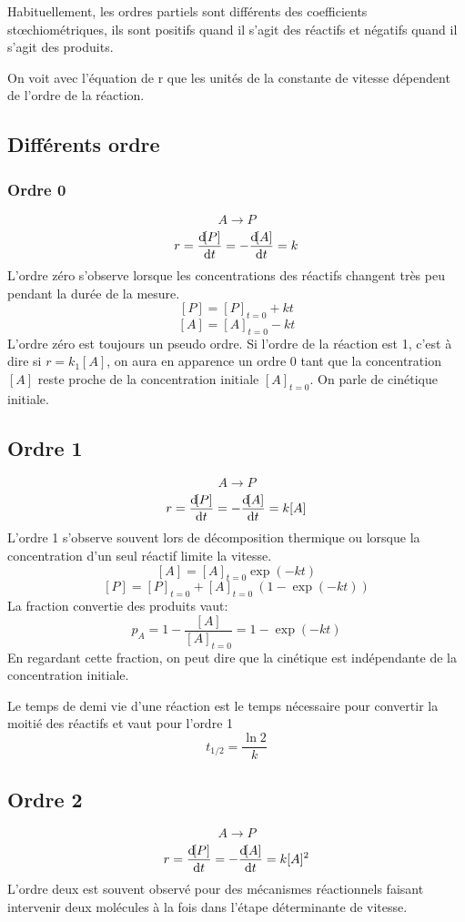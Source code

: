 Habituellement, les ordres partiels sont différents
des coefficients stœchiométriques,
ils sont positifs quand il s'agit des réactifs et
négatifs quand il s'agit des produits.

On voit avec l'équation de r que les unités de
la constante de vitesse dépendent de l'ordre de la réaction.

\subsection{Différents ordre}
\subsubsection{Ordre 0}
\[ A\longrightarrow P \]
\[ r = \frac{\operatorname{d}\! [P]}{\operatorname{d}\! t} = -\frac{\operatorname{d}\! [A]}{\operatorname{d}\! t} = k \]
L'ordre zéro s'observe lorsque les concentrations des réactifs
changent très peu pendant la durée de la mesure.
\[ [P] = [P]_{t = 0}+kt \]
\[ [A] = [A]_{t = 0}-kt \]
L'ordre zéro est toujours un pseudo ordre.
Si l'ordre de la réaction est 1, c'est à dire si $r = k_1[A]$,
on aura en apparence un ordre 0 tant que la concentration $[A]$
reste proche de la concentration initiale $[A]_{t = 0}$.
On parle de cinétique initiale.

\subsection{Ordre 1}
\[ A\longrightarrow P \]
\[ r = \frac{\operatorname{d}\! [P]}{\operatorname{d}\! t} = -\frac{\operatorname{d}\! [A]}{\operatorname{d}\! t} = k[A] \]
L'ordre 1 s'observe souvent lors de décomposition thermique ou
lorsque la concentration d'un seul réactif limite la vitesse.
\[ [A] = [A]_{t = 0} \exp(-kt) \]
\[ [P] = [P]_{t = 0}+[A]_{t = 0}\ (1-\exp (-kt)) \]
La fraction convertie des produits vaut:
\[ p_A = 1-\frac{[A]}{[A]_{t = 0}} = 1-\exp (-kt) \]
En regardant cette fraction, on peut dire que la cinétique est
indépendante de la concentration initiale.

Le temps de demi vie d'une réaction est le temps nécessaire
pour convertir la moitié des réactifs et vaut pour l'ordre 1
\[ t_{1/2} = \frac {\ln 2}{k} \]

\subsection{Ordre 2}
\[ A\longrightarrow P \]
\[ r = \frac{\operatorname{d}\! [P]}{\operatorname{d}\! t} = -\frac{\operatorname{d}\! [A]}{\operatorname{d}\! t} = k[A]^2 \]
L'ordre deux est souvent observé pour des mécanismes réactionnels faisant
intervenir deux molécules à la fois dans l'étape déterminante de vitesse.

